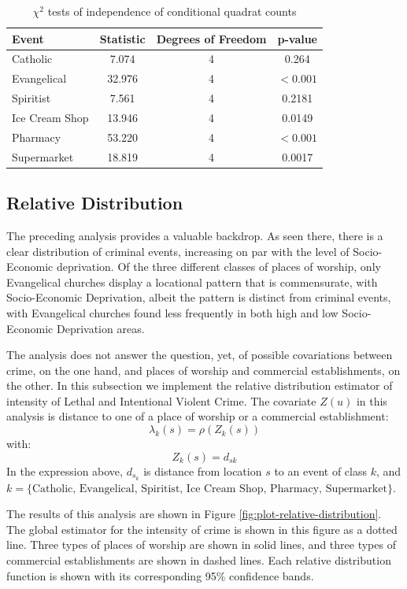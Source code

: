 \documentclass[smallextended]{svjour3}       %
\begin{document}
\begin{table}

\caption{\label{tab:table-quadrat-test-statistics}\label{tab:quadrat-test-statistics}$\chi^2$ tests of independence of conditional quadrat counts}
\centering
\begin{tabular}[t]{lccc}
\toprule
Event & Statistic & Degrees of Freedom & p-value\\
\midrule
Catholic & 7.074 & 4 & 0.264\\
Evangelical & 32.976 & 4 & $<0.001$\\
Spiritist & 7.561 & 4 & 0.2181\\
Ice Cream Shop & 13.946 & 4 & 0.0149\\
Pharmacy & 53.220 & 4 & $<0.001$\\
\addlinespace
Supermarket & 18.819 & 4 & 0.0017\\
\bottomrule
\end{tabular}
\end{table}

\hypertarget{relative-distribution}{%
\subsection{Relative Distribution}\label{relative-distribution}}

The preceding analysis provides a valuable backdrop. As seen there,
there is a clear distribution of criminal events, increasing on par with
the level of Socio-Economic deprivation. Of the three different classes
of places of worship, only Evangelical churches display a locational
pattern that is commensurate, with Socio-Economic Deprivation, albeit
the pattern is distinct from criminal events, with Evangelical churches
found less frequently in both high and low Socio-Economic Deprivation
areas.

The analysis does not answer the question, yet, of possible covariations
between crime, on the one hand, and places of worship and commercial
establishments, on the other. In this subsection we implement the
relative distribution estimator of intensity of Lethal and Intentional
Violent Crime. The covariate \(Z(u)\) in this analysis is distance to
one of a place of worship or a commercial establishment: \[
\lambda_k(s)=\rho(Z_k(s))
\] with: \[
Z_k(s) = d_{sk}
\] In the expression above, \(d_{s_k}\) is distance from location \(s\)
to an event of class \(k\), and
\(k=\{\text{Catholic, Evangelical, Spiritist, Ice Cream Shop, Pharmacy, Supermarket}\}\).

The results of this analysis are shown in Figure
\ref{fig:plot-relative-distribution}. The global estimator for the
intensity of crime is shown in this figure as a dotted line. Three types
of places of worship are shown in solid lines, and three types of
commercial establishments are shown in dashed lines. Each relative
distribution function is shown with its corresponding 95\% confidence
bands.
\end{document}
